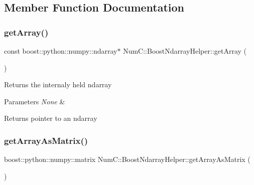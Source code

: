 \subsection{Member Function Documentation}
\mbox{\label{class_num_c_1_1_boost_ndarray_helper_acceb3bb2db61aeecba91336eb13feba0}} 
\subsubsection{\texorpdfstring{get\+Array()}{getArray()}}
{\footnotesize\ttfamily const boost\+::python\+::numpy\+::ndarray$\ast$ Num\+C\+::\+Boost\+Ndarray\+Helper\+::get\+Array (\begin{DoxyParamCaption}{ }\end{DoxyParamCaption})\hspace{0.3cm}{\ttfamily [inline]}}

Returns the internaly held ndarray


\begin{DoxyParams}{Parameters}
{\em None} & \\
\hline
\end{DoxyParams}
\begin{DoxyReturn}{Returns}
pointer to an ndarray 
\end{DoxyReturn}
\mbox{\label{class_num_c_1_1_boost_ndarray_helper_a9800430d89ded6d79b7b143b0dca5292}} 
\subsubsection{\texorpdfstring{get\+Array\+As\+Matrix()}{getArrayAsMatrix()}}
{\footnotesize\ttfamily boost\+::python\+::numpy\+::matrix Num\+C\+::\+Boost\+Ndarray\+Helper\+::get\+Array\+As\+Matrix (\begin{DoxyParamCaption}{ }\end{DoxyParamCaption})\hspace{0.3cm}{\ttfamily [inline]}}

